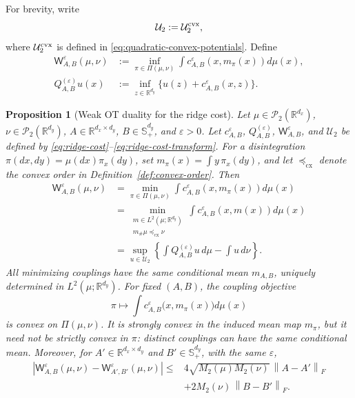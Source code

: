 \documentclass[11pt]{article}
\newcommand{\R}{\mathbb R}
\newcommand{\cP}{\mathcal P}
\newcommand{\cU}{\mathcal U}
\newcommand{\norm}[1]{\left\lVert #1\right\rVert}
\newcommand{\cx}{\preceq_{\mathrm{cx}}}
\theoremstyle{plain}
\newtheorem{proposition}[theorem]{Proposition}
\theoremstyle{definition}
\theoremstyle{remark}
\begin{document}
For brevity, write
\begin{equation}\label{eq:ridge-potential-class}
 \cU_2:=\mathcal U_2^{\rm cvx},
\end{equation}
where \(\mathcal U_2^{\rm cvx}\) is defined in
\eqref{eq:quadratic-convex-potentials}. Define
\begin{equation}\label{eq:ridge-cost-transform}
\begin{aligned}
 \mathsf W_{A,B}^\varepsilon(\mu,\nu)
 &:=\inf_{\pi\in\Pi(\mu,\nu)}
   \int c_{A,B}^\varepsilon(x,m_\pi(x))d\mu(x),\\
 Q_{A,B}^{(\varepsilon)}u(x)
 &:=\inf_{z\in\R^{d_y}}
  \{u(z)+c_{A,B}^\varepsilon(x,z)\}.
\end{aligned}
\end{equation}

\begin{proposition}[Weak OT duality for the ridge cost]\label{prop:wot}
Let \(\mu\in\cP_2(\R^{d_x})\), \(\nu\in\cP_2(\R^{d_y})\),
\(A\in\R^{d_x\times d_y}\), \(B\in\mathbb S_+^{d_y}\), and
\(\varepsilon>0\). Let \(c_{A,B}^\varepsilon\),
\(Q_{A,B}^{(\varepsilon)}\), \(\mathsf W_{A,B}^\varepsilon\), and
\(\cU_2\) be defined by
\eqref{eq:ridge-cost}--\eqref{eq:ridge-cost-transform}. For a disintegration
\(\pi(dx,dy)=\mu(dx)\pi_x(dy)\), set
\(m_\pi(x)=\int y\,\pi_x(dy)\), and let \(\cx\) denote the convex order in
Definition~\ref{def:convex-order}. Then
\[
\begin{aligned}
 \mathsf W_{A,B}^\varepsilon(\mu,\nu)
 &=\min_{\pi\in\Pi(\mu,\nu)}
   \int c_{A,B}^\varepsilon(x,m_\pi(x))d\mu(x)\\
 &=\min_{\substack{m\in L^2(\mu;\R^{d_y})\\m_\#\mu\cx\nu}}
   \int c_{A,B}^\varepsilon(x,m(x))d\mu(x)\\
 &=\sup_{u\in\cU_2}\left\{\int Q_{A,B}^{(\varepsilon)}u\,d\mu-
   \int u\,d\nu\right\}.
\end{aligned}
\]
All minimizing couplings have the same conditional mean
\(m_{A,B}\), uniquely determined in \(L^2(\mu;\R^{d_y})\). For fixed
\((A,B)\), the coupling objective
\[
 \pi\longmapsto
 \int c_{A,B}^\varepsilon\bigl(x,m_\pi(x)\bigr)d\mu(x)
\]
is convex on \(\Pi(\mu,\nu)\). It is strongly convex in the induced mean map
\(m_\pi\), but it need not be strictly convex in \(\pi\): distinct couplings can
have the same conditional mean. Moreover, for
\(A'\in\R^{d_x\times d_y}\) and \(B'\in\mathbb S_+^{d_y}\), with the same
\(\varepsilon\),
\begin{equation}\label{eq:ridge-oracle-lipschitz}
\begin{aligned}
 \left|\mathsf W_{A,B}^\varepsilon(\mu,\nu)
       -\mathsf W_{A',B'}^\varepsilon(\mu,\nu)\right|
 \le{}&4\sqrt{M_2(\mu)M_2(\nu)}\,\norm{A-A'}_F\\
 &+2M_2(\nu)\,\norm{B-B'}_F .
\end{aligned}
\end{equation}
\end{proposition}
\end{document}
